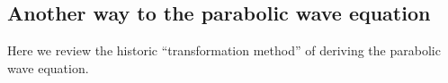 \subsection{Another way to the parabolic wave equation}
Here we review the historic ``transformation method''
of deriving the parabolic wave equation. 


